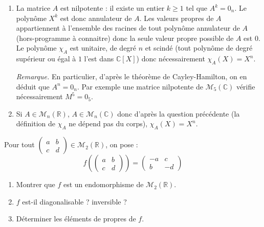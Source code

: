 \documentclass[a4paper,10pt]{report}
\begin{document}
\begin{enumerate}
\item La matrice $A$ est nilpotente : il existe un entier $k \geq 1$ tel que $A^k = 0_n$. Le polynôme $X^k$ est donc annulateur de $A$. Les valeurs propres de $A$ appartiennent à l'ensemble des racines de tout polynôme annulateur de $A$ (hors-programme à connaitre) donc la seule valeur propre possible de $A$ est $0$. Le polynôme $\chi_A$ est unitaire, de degré $n$ et scindé (tout polynôme de degré supérieur ou égal à $1$ l'est dans $\mathbb{C}[X]$) donc nécessairement $\chi_A(X)=X^n$.

\medskip

\noindent \textit{Remarque.} En particulier, d'après le théorème de Cayley-Hamilton, on en déduit que $A^n=0_n$. Par exemple une matrice nilpotente de $\mathcal{M}_5(\mathbb{C})$ vérifie nécessairement $M^5=0_5$.
\item Si $A \in \mathcal{M}_n(\mathbb{R})$, $A \in \mathcal{M}_n(\mathbb{C})$ donc d'après la question précédente (la définition de $\chi_A$ ne dépend pas du corps), $\chi_A(X)=X^n$.
\end{enumerate}

\begin{Exa} Pour tout $\begin{pmatrix}
a & b \\
c & d 
\end{pmatrix} \in \mathcal{M}_2(\mathbb{R})$, on pose :
$$ f \left( \begin{pmatrix}
a & b \\
c & d 
\end{pmatrix} \right) = \begin{pmatrix}
-a & c \\
b & -d 
\end{pmatrix}$$

\begin{enumerate}
\item Montrer que $f$ est un endomorphisme de $\mathcal{M}_2(\mathbb{R})$.
\item $f$ est-il diagonalisable ? inversible ?
\item Déterminer les éléments de propres de $f$.
\end{enumerate}
\end{Exa}

\corr 
\end{document}
